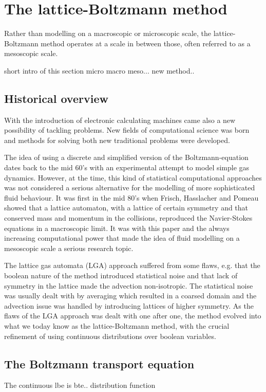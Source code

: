 \chapter{The lattice-Boltzmann method}
Rather than modelling on a macroscopic or microscopic scale, the
lattice-Boltzmann method operates at a scale in between those, often
referred to as a mesoscopic scale.

short intro of this section
micro macro meso... new method..

\section{Historical overview}
With the introduction of electronic calculating machines came also a
new possibility of tackling problems. New fields of computational
science was born and methods for solving both new traditional problems
were developed. 

The idea of using a discrete and simplified version of the
Boltzmann-equation dates back to the mid 60's \cite{scholarpedia-lbm}
with an experimental attempt to model simple gas dynamics. However, at
the time, this kind of statistical computational approaches was not
considered a serious alternative for the modelling of more
sophisticated fluid behaviour. It was first in the mid 80's when
Frisch, Hasslacher and Pomeau showed that a lattice automaton, with a
lattice of certain symmetry and that conserved mass and momentum in
the collisions, reproduced the Navier-Stokes equations in a
macroscopic limit. It was with this paper and the always increasing
computational power that made the idea of fluid modelling on a
mesoscopic scale a serious research topic.

The lattice gas automata (LGA) approach suffered from some flaws,
e.g. that the boolean nature of the method introduced statistical
noise and that lack of symmetry in the lattice made the advection
non-isotropic. The statistical noise was usually dealt with by
averaging which resulted in a coarsed domain and the advection issue
was handled by introducing lattices of higher symmetry. As the flaws
of the LGA approach was dealt with one after one, the method evolved
into what we today know as the lattice-Boltzmann method, with the
crucial refinement of using continuous distributions over boolean
variables. \cite{wolf-gladrow}

\section{The Boltzmann transport equation}
The continuous lbe is bte.. distribution function


